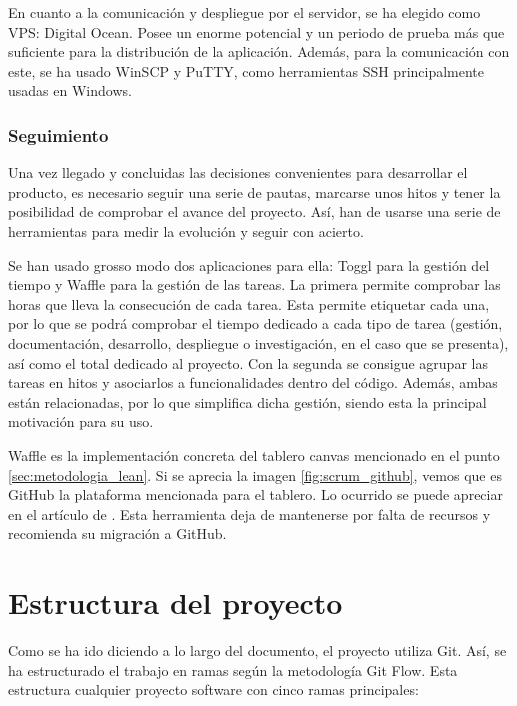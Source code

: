 En cuanto a la comunicación y despliegue por el servidor, se ha elegido como VPS: Digital Ocean. Posee un enorme potencial y un periodo de prueba más que suficiente para la distribución de la aplicación. Además, para la comunicación con este, se ha usado WinSCP y PuTTY, como herramientas SSH principalmente usadas en Windows.

\subsubsection{Seguimiento}

Una vez llegado y concluidas las decisiones convenientes para desarrollar el producto, es necesario seguir una serie de pautas, marcarse unos hitos y tener la posibilidad de comprobar el avance del proyecto. Así, han de usarse una serie de herramientas para medir la evolución y seguir con acierto.

Se han usado grosso modo dos aplicaciones para ella: Toggl para la gestión del tiempo y Waffle para la gestión de las tareas. La primera permite comprobar las horas que lleva la consecución de cada tarea. Esta permite etiquetar cada una, por lo que se podrá comprobar el tiempo dedicado a cada tipo de tarea (gestión, documentación, desarrollo, despliegue o investigación, en el caso que se presenta), así como el total dedicado al proyecto. Con la segunda se consigue agrupar las tareas en hitos y asociarlos a funcionalidades dentro del código. Además, ambas están relacionadas, por lo que simplifica dicha gestión, siendo esta la principal motivación para su uso.

Waffle es la implementación concreta del tablero canvas mencionado en el punto \ref{sec:metodologia_lean}. Si se aprecia la imagen \ref{fig:scrum_github}, vemos que es GitHub la plataforma mencionada para el tablero. Lo ocurrido se puede apreciar en el artículo de . Esta herramienta deja de mantenerse por falta de recursos y recomienda su migración a GitHub.

\section{Estructura del proyecto}\label{sec:estructra_proyecto}

Como se ha ido diciendo a lo largo del documento, el proyecto utiliza Git. Así, se ha estructurado el trabajo en ramas según la metodología Git Flow. Esta estructura cualquier proyecto software con cinco ramas principales:

